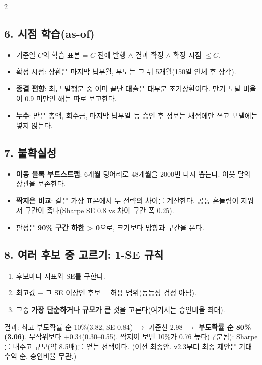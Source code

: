 \begin{multicols}{2}
\subsection*{6. 시점 학습(as-of)}
\begin{itemize}
\item 기준일 $C$의 학습 표본 = $C$ 전에 발행 $\wedge$ 결과 확정 $\wedge$ 확정 시점 $\le C$.
\item 확정 시점: 상환은 마지막 납부월, 부도는 그 뒤 5개월(150일 연체 후 상각).
\item \textbf{종결 편향}: 최근 발행분 중 이미 끝난 대출은 대부분 조기상환이다. 만기 도달 비율이 0.9 미만인 해는 따로 보고한다.
\item \textbf{누수}: 받은 총액, 회수금, 마지막 납부일 등 승인 후 정보는 채점에만 쓰고 모델에는 넣지 않는다.
\end{itemize}

\subsection*{7. 불확실성}
\begin{itemize}
\item \textbf{이동 블록 부트스트랩}: 6개월 덩어리로 48개월을 2000번 다시 뽑는다. 이웃 달의 상관을 보존한다.
\item \textbf{짝지은 비교}: 같은 가상 표본에서 두 전략의 차이를 계산한다. 공통 흔들림이 지워져 구간이 좁다(Sharpe SE 0.8 vs 차이 구간 폭 0.25).
\item 판정은 \textbf{90\% 구간 하한 > 0}으로, 크기보다 방향과 구간을 본다.
\end{itemize}

\subsection*{8. 여러 후보 중 고르기: 1-SE 규칙}
\begin{enumerate}
\item 후보마다 지표와 SE를 구한다.
\item 최고값 $-$ 그 SE 이상인 후보 = 허용 범위(동등성 검정 아님).
\item 그중 \textbf{가장 단순하거나 규모가 큰} 것을 고른다(여기서는 승인비율 최대).
\end{enumerate}
결과: 최고 부도확률 순 10\%(3.82, SE 0.84) \ensuremath{\to} 기준선 2.98 \ensuremath{\to} \textbf{부도확률 순 80\%(3.06)}. 무작위보다 +0.34(0.30--0.55). 짝지어 보면 10\%가 0.76 높다(구분됨): Sharpe를 내주고 규모(약 8.5배)를 얻는 선택이다. (이전 최종안. v2.3부터 최종 제안은 기대수익 순, 승인비율 무관.)


\end{multicols}
